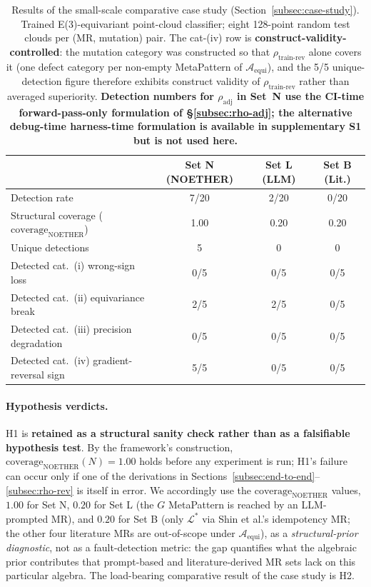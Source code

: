 \documentclass[acmsmall,screen,review]{acmart}
\begin{document}
\begin{table}[h]
\centering
\caption{Results of the small-scale comparative case study (Section~\ref{subsec:case-study}). Trained E(3)-equivariant point-cloud classifier; eight 128-point random test clouds per (MR, mutation) pair. The cat-(iv) row is \textbf{construct-validity-controlled}: the mutation category was constructed so that $\rho_{\mathrm{train\text{-}rev}}$ alone covers it (one defect category per non-empty MetaPattern of $\mathcal{A}_{\mathrm{equi}}$), and the 5/5 unique-detection figure therefore exhibits construct validity of $\rho_{\mathrm{train\text{-}rev}}$ rather than averaged superiority. \textbf{Detection numbers for $\rho_{\mathrm{adj}}$ in Set~N use the CI-time forward-pass-only formulation of \S\ref{subsec:rho-adj}; the alternative debug-time harness-time formulation is available in supplementary S1 but is not used here.}}
\label{tab:case-study}
\small
\begin{tabular}{lccc}
\toprule
& Set N (NOETHER) & Set L (LLM) & Set B (Lit.) \\
\midrule
Detection rate & 7/20 & 2/20 & 0/20 \\
Structural coverage ($\mathrm{coverage}_{\mathrm{NOETHER}}$) & 1.00 & 0.20 & 0.20 \\
Unique detections & 5 & 0 & 0 \\
Detected cat.~(i) wrong-sign loss & 0/5 & 0/5 & 0/5 \\
Detected cat.~(ii) equivariance break & 2/5 & 2/5 & 0/5 \\
Detected cat.~(iii) precision degradation & 0/5 & 0/5 & 0/5 \\
Detected cat.~(iv) gradient-reversal sign & 5/5 & 0/5 & 0/5 \\
\bottomrule
\end{tabular}
\end{table}

\paragraph{Hypothesis verdicts.}
H1 is \textbf{retained as a structural sanity check rather than as a falsifiable hypothesis test}. By the framework's construction, $\mathrm{coverage}_{\mathrm{NOETHER}}(N) = 1.00$ holds before any experiment is run; H1's failure can occur only if one of the derivations in Sections~\ref{subsec:end-to-end}--\ref{subsec:rho-rev} is itself in error. We accordingly use the $\mathrm{coverage}_{\mathrm{NOETHER}}$ values, $1.00$ for Set N, $0.20$ for Set L (the $G$ MetaPattern is reached by an LLM-prompted MR), and $0.20$ for Set B (only $\mathcal{L}^*$ via Shin et al.'s idempotency MR; the other four literature MRs are out-of-scope under $\mathcal{A}_{\mathrm{equi}}$), as a \emph{structural-prior diagnostic}, not as a fault-detection metric: the gap quantifies what the algebraic prior contributes that prompt-based and literature-derived MR sets lack on this particular algebra. The load-bearing comparative result of the case study is H2.
\end{document}
